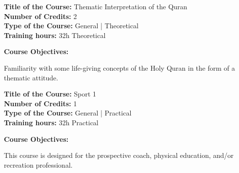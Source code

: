 \documentclass[12pt,a4paper]{article}
\begin{document}
\newpage
\nopagebreak
\textbf{Title of the Course:} Thematic Interpretation of the Quran\\
\textbf{Number of Credits:} 2\\
\textbf{Type of the Course:} General | Theoretical\\
\textbf{Training hours:} 32h Theoretical\par\vspace{4pt}
\textbf{Course Objectives:}\par\vspace{2pt}
Familiarity with some life-giving concepts of the Holy Quran in the form of a thematic attitude.\par\vspace{4pt}

\par\vspace{14pt}
\nopagebreak
\textbf{Title of the Course:} Sport 1\\
\textbf{Number of Credits:} 1\\
\textbf{Type of the Course:} General | Practical\\
\textbf{Training hours:} 32h Practical\par\vspace{4pt}
\textbf{Course Objectives:}\par\vspace{2pt}
This course is designed for the prospective coach, physical education, and/or recreation
professional.\par\vspace{4pt}
\end{document}
